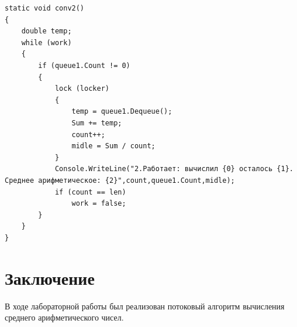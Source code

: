 \documentclass[a4paper,12pt]{article}
\begin{document}
\begin{lstlisting}[label=some-code,caption={Вычисление среднего арифметического}]
static void conv2()
{
	double temp;
	while (work)
	{
		if (queue1.Count != 0)
		{
			lock (locker)
			{
				temp = queue1.Dequeue();
				Sum += temp;
				count++;
				midle = Sum / count;
			}
			Console.WriteLine("2.Работает: вычислил {0} осталось {1}. Среднее арифметическое: {2}",count,queue1.Count,midle);
			if (count == len)
				work = false;
		}
	}
}
\end{lstlisting}

\section{Заключение}
	В ходе лабораторной работы был реализован потоковый алгоритм вычисления среднего арифметического чисел.
\end{document}
